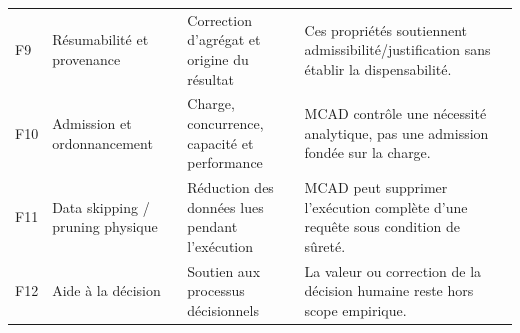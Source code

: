 \begin{table}[!t]
\begin{tabularx}{\textwidth}{p{} p{} X X}
F9 & Résumabilité et provenance~\cite{SimonAmannLiuGancarski2023,AlOmeirLaiMilaniPottinger2023} & Correction d'agrégat et origine du résultat & Ces propriétés soutiennent admissibilité/justification sans établir la dispensabilité. \\
F10 & Admission et ordonnancement~\cite{KraftWIQ2012,KrompassDayalKunoKemper2007,PowleyMartinGruskaBirdKalmuk2014,SafeLoad2025} & Charge, concurrence, capacité et performance & MCAD contrôle une nécessité analytique, pas une admission fondée sur la charge. \\
F11 & Data skipping / pruning physique~\cite{NiuDataSkipping2021} & Réduction des données lues pendant l'exécution & MCAD peut supprimer l'exécution complète d'une requête sous condition de sûreté. \\
F12 & Aide à la décision~\cite{ChenBI2012,Pourshahid2014,SadanaEJOR2025} & Soutien aux processus décisionnels & La valeur ou correction de la décision humaine reste hors scope empirique. \\
\bottomrule
\end{tabularx}
\end{table}
